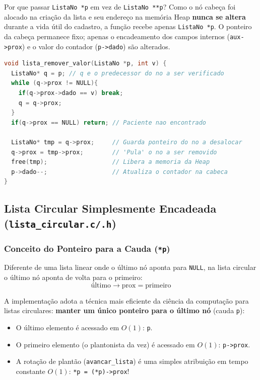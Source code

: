 \documentclass[11pt,a4paper]{article}
\begin{document}
\begin{conceitobox}{Por que passar \texttt{ListaNo *p} em vez de \texttt{ListaNo **p}?}
Como o nó cabeça foi alocado na criação da lista e seu endereço na memória Heap \textbf{nunca se altera} durante a vida útil do cadastro, a função recebe apenas \texttt{ListaNo *p}. O ponteiro da cabeça permanece fixo; apenas o encadeamento dos campos internos (\texttt{aux->prox}) e o valor do contador (\texttt{p->dado}) são alterados.
\end{conceitobox}

\begin{lstlisting}[language=C, caption={{Remoção Segura por Valor}}]
void lista_remover_valor(ListaNo *p, int v) {
  ListaNo* q = p; // q e o predecessor do no a ser verificado
  while (q->prox != NULL){
    if(q->prox->dado == v) break;
    q = q->prox;
  }
  if(q->prox == NULL) return; // Paciente nao encontrado
  
  ListaNo* tmp = q->prox;     // Guarda ponteiro do no a desalocar
  q->prox = tmp->prox;        // 'Pula' o no a ser removido
  free(tmp);                  // Libera a memoria da Heap
  p->dado--;                  // Atualiza o contador na cabeca
}
\end{lstlisting}

\newpage

\subsection{Lista Circular Simplesmente Encadeada (\texttt{lista\_circular.c/.h})}

\subsubsection{Conceito do Ponteiro para a Cauda (\texttt{*p})}
Diferente de uma lista linear onde o último nó aponta para \texttt{NULL}, na lista circular o último nó aponta de volta para o primeiro:
\begin{equation}
    \text{último}\to\text{prox} = \text{primeiro}
\end{equation}

A implementação adota a técnica mais eficiente da ciência da computação para listas circulares: \textbf{manter um único ponteiro para o último nó} (cauda \texttt{p}):
\begin{itemize}
    \item O último elemento é acessado em $O(1)$: \texttt{p}.
    \item O primeiro elemento (o plantonista da vez) é acessado em $O(1)$: \texttt{p->prox}.
    \item A rotação de plantão (\texttt{avancar\_lista}) é uma simples atribuição em tempo constante $O(1)$: \texttt{*p = (*p)->prox}!
\end{itemize}
\end{document}
